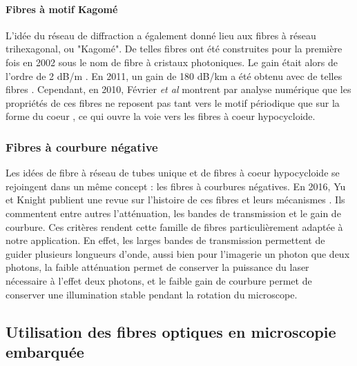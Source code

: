 \paragraph{Fibres à motif Kagomé}
L'idée du réseau de diffraction a également donné lieu aux fibres à réseau trihexagonal, ou "Kagomé". De telles fibres ont été construites pour la première fois en 2002 sous le nom de fibre à cristaux photoniques. Le gain était alors de l'ordre de 2 dB/m \cite{benabid_stimulated_2002}. En 2011, un gain de 180 dB/km a été obtenu avec de telles fibres \cite{wang_low_2011}.
Cependant, en 2010, Février \emph{et al} montrent par analyse numérique que les propriétés de ces fibres ne reposent pas tant vers le motif périodique que sur la forme du coeur \cite{fevrier_understanding_2010}, ce qui ouvre la voie vers les fibres à coeur hypocycloide. 


\subsubsection{Fibres à courbure négative}

Les idées de fibre à réseau de tubes unique et de fibres à coeur hypocycloide se rejoingent dans un même concept : les fibres à courbures négatives. En 2016, Yu et Knight publient une revue sur l'histoire de ces fibres et leurs mécanismes \cite{yu_negative_2016}. Ils commentent entre autres l'atténuation, les bandes de transmission et le gain de courbure. Ces critères rendent cette famille de fibres particulièrement adaptée à notre application. En effet, les larges bandes de transmission permettent de guider plusieurs longueurs d'onde, aussi bien pour l'imagerie un photon que deux photons, la faible atténuation permet de conserver la puissance du laser nécessaire à l'effet deux photons, et le faible gain de courbure permet de conserver une illumination stable pendant la rotation du microscope.



\subsection{Utilisation des fibres optiques en microscopie embarquée}

